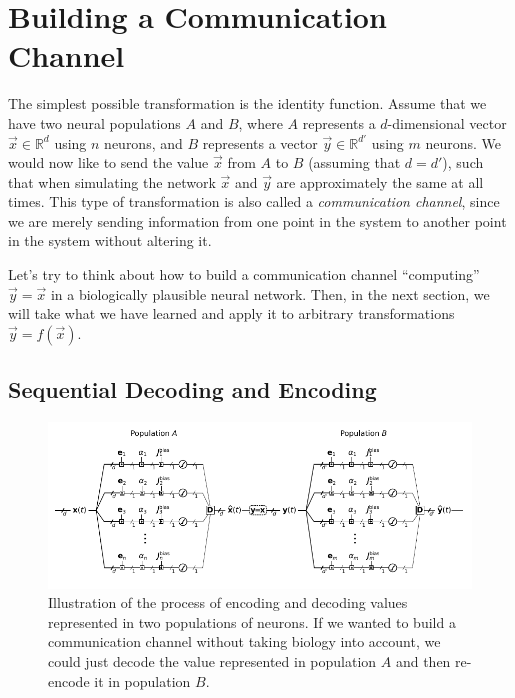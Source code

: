 \documentclass[10pt,letterpaper,oneside]{article}
\begin{document}
	\section{Building a Communication Channel}
	
	The simplest possible transformation is the identity function. Assume that we have two neural populations $A$ and $B$, where $A$ represents a $d$-dimensional vector $\vec x \in \mathbb{R}^{d}$ using $n$ neurons, and $B$ represents a vector $\vec y \in \mathbb{R}^{d'}$ using $m$ neurons. We would now like to send the value $\vec x$ from $A$ to $B$ (assuming that $d = d'$), such that when simulating the network $\vec x$ and $\vec y$ are approximately the same at all times. This type of transformation is also called a \emph{communication channel}, since we are merely sending information from one point in the system to another point in the system without altering it.

	Let's try to think about how to build a communication channel \enquote{computing} $\vec y = \vec x$ in a biologically plausible neural network. Then, in the next section, we will take what we have learned and apply it to arbitrary transformations $\vec y = f(\vec x)$.
	
	\subsection{Sequential Decoding and Encoding}
	
	\begin{figure}[p]
		\includegraphics[width=\textwidth]{media/transformation_04.pdf}
		\caption{Illustration of the process of encoding and decoding values represented in two populations of neurons. If we wanted to build a communication channel without taking biology into account, we could just decode the value represented in population $A$ and then re-encode it in population $B$.}
		\label{fig:transformation_04}
	\end{figure}
	
\end{document}
